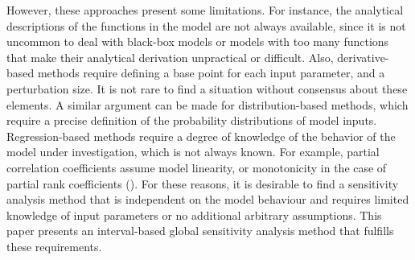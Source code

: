 \documentclass[twocolumn]{rps-esrel2022}
\begin{document}
However, these approaches present some limitations.
For instance, the analytical descriptions of the functions in the model are not always available, since it is not uncommon to deal with black-box models or
models with too many functions that make their analytical derivation unpractical or difficult.
Also, derivative-based methods require defining a base point for each input parameter, and a perturbation size.
It is not rare to find a situation without consensus about these elements.
A similar argument can be made for distribution-based methods, which require a precise definition of the probability distributions of model inputs.
Regression-based methods require a degree of knowledge of the behavior of the model under investigation, which is not always known.
For example, partial correlation coefficients assume model linearity, or monotonicity in the case of partial rank coefficients (\cite{saltelli1990non}).
For these reasons, it is desirable to find a sensitivity analysis method that is independent on the model behaviour and requires limited knowledge of input parameters or no additional arbitrary assumptions.
%
%
%
%
This paper presents an interval-based global sensitivity analysis method that fulfills these requirements.

\end{document}
